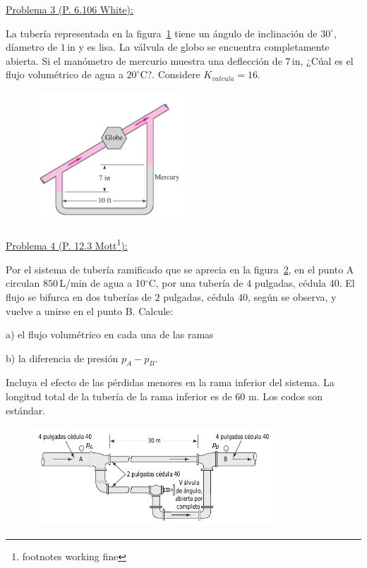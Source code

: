 \documentclass[11pt]{report}
\begin{document}




\underline {Problema 3 (P. 6.106 White):}
\vspace{0.2cm}

La tuber\'ia representada en la figura~\ref{fig:fig2} tiene un \'angulo de inclinaci\'on de $30^\circ$, d\'iametro de $1$\,in y es lisa. La v\'alvula de globo se encuentra completamente abierta. Si el man\'ometro de mercurio muestra una deflecci\'on de $7$\,in, ¿C\'ual es el flujo volum\'etrico de agua a $20^\circ$C?. Considere $K_{valvula}=16$.

\begin{figure}[H]
\centering\includegraphics[width=0.5\textwidth]{Figures/p2.png}
\caption{\label{fig:fig2} }
\end{figure}


\underline {Problema 4 (P. 12.3 Mott\footnote{footnotes working fine}):}

Por el sistema de tubería ramificado que se aprecia en la figura~\ref{fig:fig4}, en el punto A circulan $850$\,L/min de agua a 10$^\circ$C, por una tubería de $4$ pulgadas, c\'edula 40. El flujo se bifurca en dos tuberías de $2$ pulgadas, c\'edula $40$, según se observa, y vuelve a unirse en el punto B. Calcule:
\vspace{0.2cm}

a) el flujo volumétrico en cada una de las ramas 

b) la diferencia de presión $p_A-p_B$. 
\vspace{0.2cm}

Incluya el efecto de las pérdidas menores en la rama inferior del sistema. La longitud total de la tubería de la rama inferior es de 60 m. Los codos son estándar.
\vspace{0.2cm}

\begin{figure}[H]
\centering\includegraphics[width=0.8\textwidth]{Figures/p4.png}
\caption{\label{fig:fig4} }
\end{figure}
\end{document}
